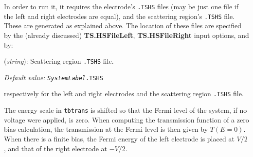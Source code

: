\documentclass[11pt]{article}
\begin{document}
In order to run it, it requires the electrode's \texttt{.TSHS} files
(may be just one file if the left and right electrodes are equal), 
and the
scattering region's \texttt{.TSHS} file.  These are generated as explained
above.  The location of these files are specified by the (already
discussed) {\bf TS.HSFileLeft}, {\bf TS.HSFileRight} input options,
and by:
\begin{description}
    \itemsep 10pt
    \parsep 0pt

\item [{\bf TS.TBT.HSFile}]({\it string}): Scattering region \texttt{.TSHS} file.

{\it Default value:} {\tt {\it SystemLabel}.TSHS}
\end{description}
respectively for the left and right electrodes and the scattering
region \texttt{.TSHS} file.

The energy scale in {\tt tbtrans} is shifted so that the Fermi level
of the system, if no voltage were applied, is zero. When computing the
transmission function of a zero bias calculation, the transmission at
the Fermi level is then given by $T(E=0)$. When there is a finite bias,
the Fermi energy of the left electrode is placed at $V/2$, and that of
the right electrode at $-V/2$.
\end{document}
